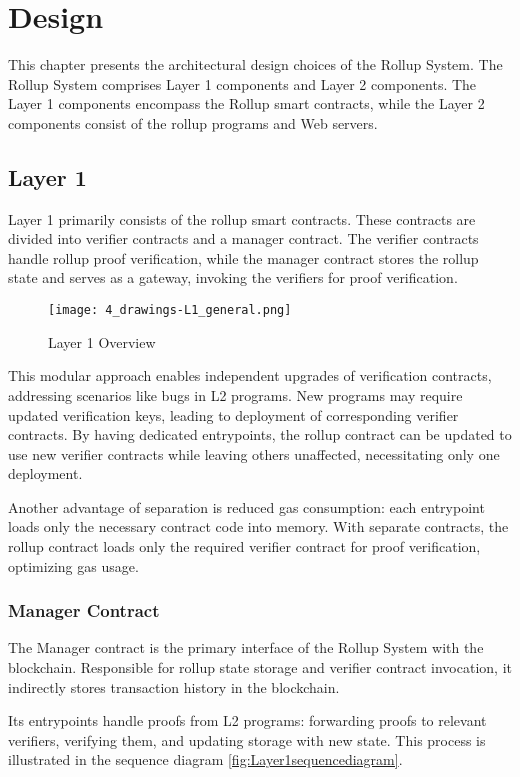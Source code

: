 \chapter{Design\label{cha:chapter4}}
This chapter presents the architectural design choices of the Rollup System. The Rollup System comprises Layer 1 components and Layer 2 components. The Layer 1 components encompass the Rollup smart contracts, while the Layer 2 components consist of the rollup programs and Web servers.

\section{Layer 1\label{sec:designLayer1}}
Layer 1 primarily consists of the rollup smart contracts. These contracts are divided into verifier contracts and a manager contract. The verifier contracts handle rollup proof verification, while the manager contract stores the rollup state and serves as a gateway, invoking the verifiers for proof verification.

\begin{figure}[htb]
  \centering
  \texttt{[image: 4\_drawings-L1\_general.png]}
  \caption{Layer 1 Overview}
  \label{fig:Layer1overview}
\end{figure}

This modular approach enables independent upgrades of verification contracts, addressing scenarios like bugs in L2 programs. New programs may require updated verification keys, leading to deployment of corresponding verifier contracts. By having dedicated entrypoints, the rollup contract can be updated to use new verifier contracts while leaving others unaffected, necessitating only one deployment.

Another advantage of separation is reduced gas consumption: each entrypoint loads only the necessary contract code into memory. With separate contracts, the rollup contract loads only the required verifier contract for proof verification, optimizing gas usage.

\subsection{Manager Contract\label{sec:designrollupcontract}}
The Manager contract is the primary interface of the Rollup System with the blockchain. Responsible for rollup state storage and verifier contract invocation, it indirectly stores transaction history in the blockchain.

Its entrypoints handle proofs from L2 programs: forwarding proofs to relevant verifiers, verifying them, and updating storage with new state. This process is illustrated in the sequence diagram \ref{fig:Layer1sequencediagram}.


